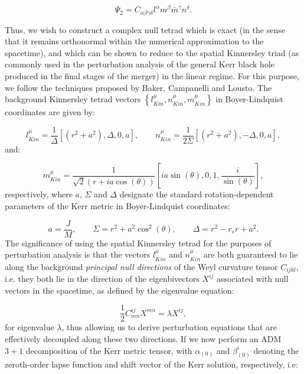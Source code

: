 \documentclass{article}
\begin{document}
\begin{equation}
\Psi_2 = C_{\alpha \beta \gamma \delta} l^{\alpha} m^{\beta} \bar{m}^{\gamma} n^{\delta}.
\end{equation}

Thus, we wish to construct a complex null tetrad which is exact (in the sense that it remains orthonormal within the numerical approximation to the spacetime), and which can be shown to reduce to the spatial Kinnersley triad (as commonly used in the perturbation analysis of the general Kerr black hole produced in the final stages of the merger) in the linear regime. For this purpose, we follow the techniques proposed by Baker, Campanelli and Lousto\cite{baker2}. The background Kinnersley tetrad vectors ${\left\lbrace l_{Kin}^{\mu}, n_{Kin}^{\mu}, m_{Kin}^{\mu} \right\rbrace}$ in Boyer-Lindquist coordinates are given by\cite{teukolsky}\cite{press}:

\begin{equation}
l_{Kin}^{\mu} = \frac{1}{\Delta} \left[ \left( r^2 + a^2 \right), \Delta, 0, a \right], \qquad n_{Kin}^{\mu} = \frac{1}{2 \Sigma} \left[ \left( r^2 + a^2 \right), - \Delta, 0, a \right],
\end{equation}
and:

\begin{equation}
m_{Kin}^{\mu} = \frac{1}{\sqrt{2} \left( r + i a \cos \left( \theta \right) \right)} \left[ i a \sin \left( \theta \right), 0, 1, \frac{i}{\sin \left( \theta \right)} \right],
\end{equation}
respectively, where $a$, ${\Sigma}$ and ${\Delta}$ designate the standard rotation-dependent parameters of the Kerr metric in Boyer-Lindquist coordinates:

\begin{equation}
a = \frac{J}{M}, \qquad \Sigma = r^2 + a^2 \cos^2 \left( \theta \right), \qquad \Delta = r^2 - r_s r + a^2.
\end{equation}
The significance of using the spatial Kinnersley tetrad for the purposes of perturbation analysis is that the vectors ${l_{Kin}^{\mu}}$ and ${n_{Kin}^{\mu}}$ are both guaranteed to lie along the background \textit{principal null directions} of the Weyl curvature tensor ${C_{i j k l}}$, i.e. they both lie in the direction of the eigenbivectors ${X^{i j}}$ associated with null vectors in the spacetime, as defined by the eigenvalue equation:

\begin{equation}
\frac{1}{2} C^{i j}_{m n} X^{m n} = \lambda X^{i j},
\end{equation}
for eigenvalue ${\lambda}$, thus allowing us to derive perturbation equations that are effectively decoupled along these two directions. If we now perform an ADM ${3 + 1}$ decomposition of the Kerr metric tensor, with ${\alpha_{\left( 0 \right)}}$ and ${\beta_{\left( 0 \right)}^{i}}$ denoting the zeroth-order lapse function and shift vector of the Kerr solution, respectively, i.e:
\end{document}
